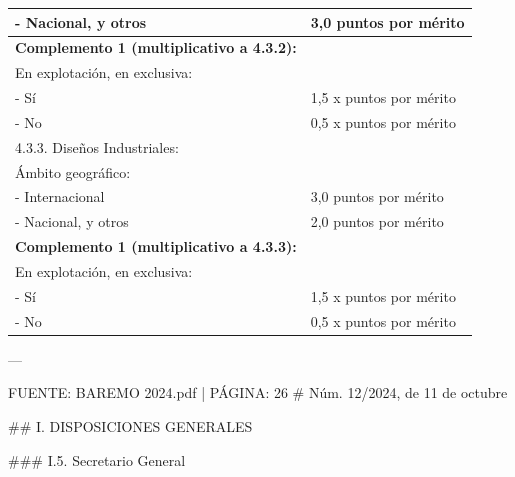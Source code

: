 \documentclass{article}
\begin{document}
\begin{itemize}
\begin{itemize}
\begin{scriptsize}
\begin{table}[h!]
\begin{tabular}{|p{}|p{}|}
                      - Nacional, y otros                                      & 3,0 puntos por mérito   \\\hline
                      \textbf{Complemento 1 (multiplicativo a 4.3.2):}         &                         \\\hline
                      En explotación, en exclusiva:                            &                         \\\hline
                      - Sí                                                     & 1,5 x puntos por mérito \\\hline
                      - No                                                     & 0,5 x puntos por mérito \\\hline
                      4.3.3. Diseños Industriales:                             &                         \\\hline
                      Ámbito geográfico:                                       &                         \\\hline
                      - Internacional                                          & 3,0 puntos por mérito   \\\hline
                      - Nacional, y otros                                      & 2,0 puntos por mérito   \\\hline
                      \textbf{Complemento 1 (multiplicativo a 4.3.3):}         &                         \\\hline
                      En explotación, en exclusiva:                            &                         \\\hline
                      - Sí                                                     & 1,5 x puntos por mérito \\\hline
                      - No                                                     & 0,5 x puntos por mérito \\\hline
                    \end{tabular}\end{table}
                  \vspace{0.4cm}

                  ---

                  FUENTE: BAREMO 2024.pdf | PÁGINA: 26
                  \# Núm. 12/2024, de 11 de octubre

                  \#\# I. DISPOSICIONES GENERALES

                  \#\#\# I.5. Secretario General


\end{scriptsize}
\end{itemize}
\end{itemize}
\end{document}
